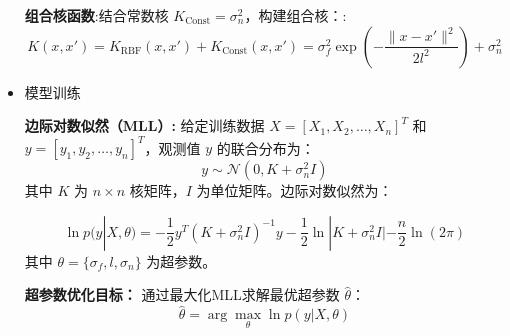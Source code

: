 \documentclass[withoutpreface,bwprint]{cumcmthesis}
\begin{document}
\begin{itemize}
    \textbf{组合核函数}:结合常数核 \( K_{\text{Const}} = \sigma_n^2 \)，构建组合核：:
    \begin{equation}
    K(x, x') = K_{\text{RBF}}(x, x') + K_{\text{Const}}(x, x') = \sigma_f^2 \exp\left(-\frac{\|x - x'\|^2}{2l^2}\right) + \sigma_n^2   
    \end{equation}
 
    \item 模型训练
    \par
    \textbf{边际对数似然（MLL）:}
    给定训练数据 \( X = [X_1, X_2, \dots, X_n]^T \) 和 \( y = [y_1, y_2, \dots, y_n]^T \)，观测值 \( y \) 的联合分布为：
    \begin{equation}
        y \sim \mathcal{N}(0, K + \sigma_n^2 I)
    \end{equation}
    其中 \( K \) 为 \( n \times n \) 核矩阵，\( I \) 为单位矩阵。边际对数似然为：\par
    \begin{equation}
        \ln p(y|X, \theta) = -\frac{1}{2}y^T(K + \sigma_n^2 I)^{-1}y - \frac{1}{2}\ln|K + \sigma_n^2 I| - \frac{n}{2}\ln(2\pi)
    \end{equation}
    其中 \( \theta = \{\sigma_f, l, \sigma_n\} \) 为超参数。 
    \par
    \textbf{超参数优化目标：}
    通过最大化MLL求解最优超参数 \( \hat{\theta} \)： \[ \hat{\theta} = \arg\max_{\theta} \ln p(y|X, \theta) \] 



\end{itemize}
\end{document}
